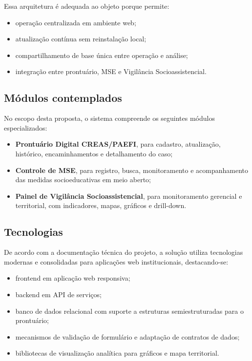 \documentclass[12pt,a4paper]{article}
\begin{document}
Essa arquitetura é adequada ao objeto porque permite:

\begin{itemize}[leftmargin=1.5cm]
\item operação centralizada em ambiente web;
\item atualização contínua sem reinstalação local;
\item compartilhamento de base única entre operação e análise;
\item integração entre prontuário, MSE e Vigilância Socioassistencial.
\end{itemize}

\subsection{Módulos contemplados}

No escopo desta proposta, o sistema compreende os seguintes módulos especializados:

\begin{itemize}[leftmargin=1.5cm]
\item \textbf{Prontuário Digital CREAS/PAEFI}, para cadastro, atualização, histórico, encaminhamentos e detalhamento do caso;
\item \textbf{Controle de MSE}, para registro, busca, monitoramento e acompanhamento das medidas socioeducativas em meio aberto;
\item \textbf{Painel de Vigilância Socioassistencial}, para monitoramento gerencial e territorial, com indicadores, mapas, gráficos e drill-down.
\end{itemize}

\subsection{Tecnologias}

De acordo com a documentação técnica do projeto, a solução utiliza tecnologias modernas e consolidadas para aplicações web institucionais, destacando-se:

\begin{itemize}[leftmargin=1.5cm]
\item frontend em aplicação web responsiva;
\item backend em API de serviços;
\item banco de dados relacional com suporte a estruturas semiestruturadas para o prontuário;
\item mecanismos de validação de formulário e adaptação de contratos de dados;
\item bibliotecas de visualização analítica para gráficos e mapa territorial.
\end{itemize}
\end{document}
